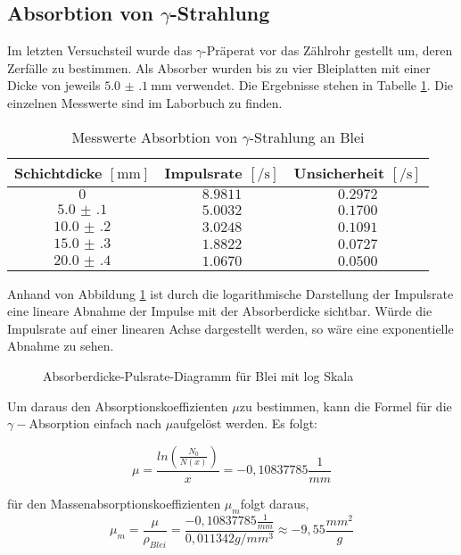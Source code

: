 \subsection{Absorbtion von $ \gamma $-Strahlung}
Im letzten Versuchsteil wurde das $\gamma$-Präperat vor das Zählrohr
gestellt um, deren Zerfälle zu bestimmen. Als Absorber wurden bis zu vier Bleiplatten mit einer Dicke von jeweils $ \SI{5.0(1)}{\milli\meter} $ verwendet. Die Ergebnisse stehen in Tabelle \ref{tab:abs_pb}. Die einzelnen Messwerte sind im Laborbuch zu finden.
\begin{table}[h!]
\centering
\begin{tabular}{c|c|c}
Schichtdicke $ [\si{\milli\meter}] $ & Impulsrate $ [\si{\per\second}] $ & Unsicherheit $ [\si{\per\second}] $ \\\hline
$ 0 $ & $ \num{8.9811} $ & $ \num{0.2972} $ \\
$ \num{5.0(1)} $ & $ \num{5.0032} $ & $ \num{0.1700} $ \\
$ \num{10.0(2)} $ & $ \num{3.0248} $ & $ \num{0.1091} $ \\
$ \num{15.0(3)} $ & $ \num{1.8822} $ & $ \num{0.0727} $ \\
$ \num{20.0(4)} $ & $ \num{1.0670} $ & $ \num{0.0500} $
\end{tabular}
\caption{Messwerte Absorbtion von $ \gamma $-Strahlung an Blei}
\label{tab:abs_pb}
\end{table}

Anhand von Abbildung \ref{fig:pb_log} ist durch die logarithmische Darstellung der
Impulsrate eine lineare Abnahme der Impulse mit der Absorberdicke
sichtbar. Würde die Impulsrate auf einer linearen Achse dargestellt
werden, so wäre eine exponentielle Abnahme zu sehen.

\begin{figure}[h!]
\centering

\caption{Absorberdicke-Pulsrate-Diagramm für Blei mit log Skala}
\label{fig:pb_log}
\end{figure}

Um daraus den Absorptionskoeffizienten $\mu$zu bestimmen, kann die
Formel für die $\gamma-$Absorption einfach nach $\mu$aufgelöst werden.
Es folgt:

\[
\mu=\frac{ln\left(\frac{N_{0}}{N(x)}\right)}{x}=-0,10837785\frac{1}{mm}
\]


für den Massenabsorptionskoeffizienten $\mu_{m}$folgt daraus,
\[
\mu_{m}=\frac{\mu}{\rho_{Blei}}=\frac{-0,10837785\frac{1}{mm}}{0,011342g/mm^{3}}\approx-9,55\frac{mm^{2}}{g}
\]



